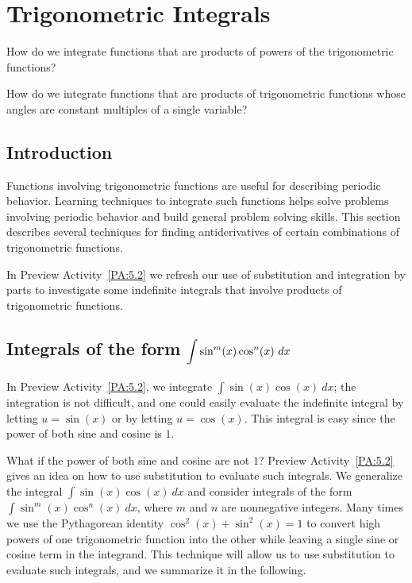 \section{Trigonometric Integrals} \label{S:5.2.TrigInt}

\begin{goals}
\item How do we integrate functions that are products of powers of the trigonometric functions?
\item How do we integrate functions that are products of trigonometric functions whose angles are constant multiples of a single variable?
\end{goals}


\subsection*{Introduction}

Functions involving trigonometric functions are useful for describing periodic behavior.  Learning techniques to integrate such functions helps solve problems involving periodic behavior and build general problem solving skills.
 This section describes several techniques for finding antiderivatives of certain combinations of trigonometric functions.

In Preview Activity~\ref{PA:5.2} we refresh our use of substitution and integration by parts to investigate some indefinite integrals that involve products of trigonometric functions.


\subsection*{Integrals of the form $\ds \int \sin^m (x) \cos^n (x)\ dx$} 

In Preview Activity~\ref{PA:5.2}, we integrate $\int \sin(x) \cos(x) \ dx$; the integration is not difficult, and one could easily evaluate the indefinite integral by letting $u=\sin(x) $ or by letting $u = \cos(x)$. This integral is easy since the power of both sine and cosine is $1$. 

What if the power of both sine and cosine are not $1$? Preview Activity~\ref{PA:5.2} gives an idea on how to use substitution to evaluate such integrals. We generalize the integral $\int \sin(x) \cos(x) \ dx$ and consider integrals of the form $\int \sin^m(x) \cos^n(x)\ dx$, where $m$ and $n$ are nonnegative integers. Many times we use the Pythagorean identity $\cos^2 (x) + \sin^2(x) = 1$ to convert high powers of one trigonometric function into the other while leaving a single sine or cosine term in the integrand. This technique will allow us to use substitution to evaluate such integrals, and we summarize it in the following.

